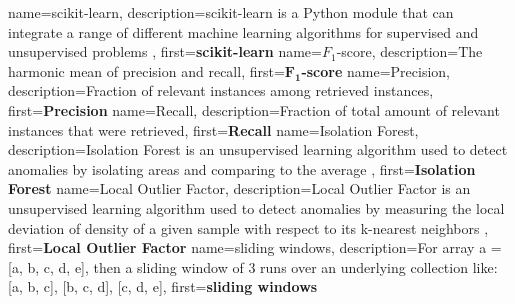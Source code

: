 {
    name=scikit-learn,
    description={scikit-learn is a Python module that can integrate a range of different machine learning algorithms for supervised and unsupervised problems \cite{scikit-learn}},
    first={\textbf{scikit-learn}}
}
{
    name=$F_1$-score,
    description={The harmonic mean of precision and recall},
    first={$\mathbf{F_1}$\textbf{-score}}
}
{
    name=Precision,
    description={Fraction of relevant instances among retrieved instances},
    first={\textbf{Precision}}
}
{
    name=Recall,
    description={Fraction of total amount of relevant instances that were retrieved},
    first={\textbf{Recall}}
}
{
    name=Isolation Forest,
    description={Isolation Forest is an unsupervised learning algorithm used to detect anomalies by isolating areas and comparing to the average \cite{isolation_forest}},
    first={\textbf{Isolation Forest}}
}
{
    name=Local Outlier Factor,
    description={Local Outlier Factor is an unsupervised learning algorithm used to detect anomalies by measuring the local deviation of density of a given sample with respect to its k-nearest neighbors \cite{lof}},
    first={\textbf{Local Outlier Factor}}
}
{
    name=sliding windows,
    description={For array a = [a, b, c, d, e], then a sliding window of 3 runs over an underlying collection like: [a, b, c], [b, c, d], [c, d, e]},
    first={\textbf{sliding windows}}
}

